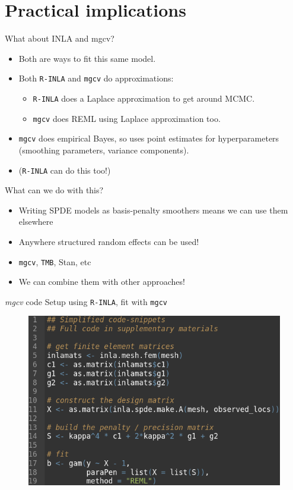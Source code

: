 \documentclass{beamer}
\begin{document}
\section{Practical implications}
\begin{frame}{What about INLA and mgcv?}
  \begin{itemize}
   \item Both are ways to fit this same model.   
    \item Both \texttt{R-INLA} and \texttt{mgcv} do approximations:
    \begin{itemize}
    		\item \texttt{R-INLA} does a Laplace approximation to get around MCMC.
 	    \item \texttt{mgcv} does REML using Laplace approximation too.
	\end{itemize}
    	\item \texttt{mgcv} does empirical Bayes, so uses point estimates for hyperparameters (smoothing parameters, variance components). 
    \item (\texttt{R-INLA} can do this too!)
  \end{itemize}
\end{frame}

\begin{frame}{What can we do with this?}
  \begin{itemize}
	\item Writing SPDE models as basis-penalty smoothers means we can use them elsewhere
 	\item Anywhere structured random effects can be used!
	\item \texttt{mgcv}, \texttt{TMB}, Stan, etc
	\item We can combine them with other approaches!
  \end{itemize}
\end{frame}

\begin{frame}{\textit{mgcv} code}
Setup using \texttt{R-INLA}, fit with \texttt{mgcv}
		\begin{figure}
		\begin{center}
			\includegraphics[scale = 0.5]{figures/mgcvcode.png}
		\end{center}
	\end{figure}
\end{frame}
\end{document}
